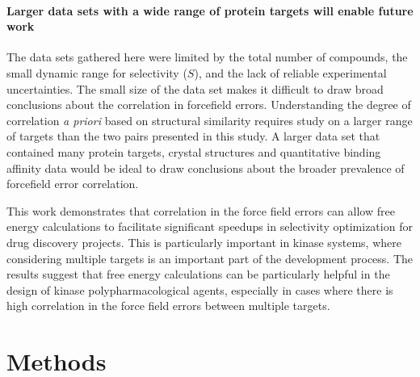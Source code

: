 \documentclass[phd,tocprelim]{cornell}
\begin{document}
\paragraph{Larger data sets with a wide range of protein targets will enable future work}

The data sets gathered here were limited by the total number of compounds, the small dynamic range for selectivity ($S$), and the lack of reliable experimental uncertainties. The small size of the data set makes it difficult to draw broad conclusions about the correlation in forcefield errors. Understanding the degree of correlation \emph{a priori} based on structural similarity requires study on a larger range of targets than the two pairs presented in this study. A larger data set that contained many protein targets, crystal structures and quantitative binding affinity data would be ideal to draw conclusions about the broader prevalence of forcefield error correlation. 

This work demonstrates that correlation in the force field errors can allow free energy calculations to facilitate significant speedups in selectivity optimization for drug discovery projects. This is particularly important in kinase systems, where considering multiple targets is an important part of the development process. The results suggest that free energy calculations can be particularly helpful in the design of kinase polypharmacological agents, especially in cases where there is high correlation in the force field errors between multiple targets. 



\section{Methods}
\end{document}
